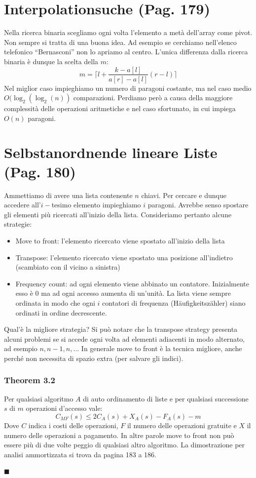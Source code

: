 \documentclass[a4paper]{book}
\newenvironment{mytheorem}[1]{\subsubsection*{Theorem #1}}{\begin{flushright}$\blacksquare$\end{flushright}}
\begin{document}
\section{Interpolationsuche (Pag. 179)}
Nella ricerca binaria scegliamo ogni volta l'elemento a metà dell'array come pivot. Non sempre si tratta di una buona idea. Ad esempio se cerchiamo nell'elenco telefonico ``Bernasconi'' non lo apriamo al centro. L'unica differenza dalla ricerca binaria è dunque la scelta della $m$:
$$m= \lceil l+ \frac{k-a[l]}{a[r]-a[l]}(r-l) \rceil$$
Nel miglior caso impieghiamo un numero di paragoni costante, ma nel caso medio $O(\log_2(\log_2(n))$ comparazioni. Perdiamo però a causa della maggiore complessità delle operazioni aritmetiche e nel caso sfortunato, in cui impiega $O(n)$ paragoni.
\section{Selbstanordnende lineare Liste (Pag. 180)}
Ammettiamo di avere una lista contenente $n$ chiavi. Per cercare e dunque accedere all'$i-$tesimo elemento impieghiamo $i$ paragoni. Avrebbe senso spostare gli elementi più ricercati all'inizio della lista. Consideriamo pertanto alcune strategie: 
\begin{itemize}
\item Move to front: l'elemento ricercato viene spostato all'inizio della lista
\item Transpose: l'elemento ricercato viene spostato una posizione all'indietro (scambiato con il vicino a sinistra)
\item Frequency count: ad ogni elemento viene abbinato un contatore. Inizialmente esso è 0 ma ad ogni accesso aumenta di un'unità. La lista viene sempre ordinata in modo che ogni $i$ contatori di frequenza (Häufigkeitszähler) siano ordinati in ordine decrescente. 
\end{itemize}
Qual'è la migliore strategia? Si può notare che la transpose strategy presenta alcuni problemi se si accede ogni volta ad elementi adiacenti in modo alternato, ad esempio $n,n-1,n,\dots$ In generale move to front è la tecnica migliore, anche perché non necessita di spazio extra (per salvare gli indici).
\begin{mytheorem}{3.2}
Per qualsiasi algoritmo $A$ di auto ordinamento di liste e per qualsiasi successione $s$ di $m$ operazioni d'accesso vale:
$$ C_{MF}(s) \leq 2C_A(s)+X_A(s)-F_A(s)-m $$
Dove $C$ indica i costi delle operazioni, $F$ il numero delle operazioni gratuite e $X$ il numero delle operazioni a pagamento. In altre parole move to front non può essere più di due volte peggio di qualsiasi altro algoritmo. La dimostrazione per analisi ammortizzata si trova da pagina 183 a 186.
\end{mytheorem}
\end{document}
